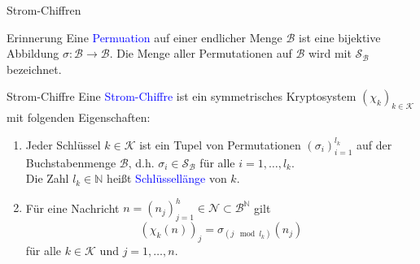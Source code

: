 \documentclass{beamer}
\newcommand{\mc}{\mathcal}
\newcommand{\N}{\mathbb{N}}
\newcommand{\Sy}{\mathcal{S}}
\newcommand{\tb}[1]{{\textcolor{blue}{#1}}}
\theoremstyle{plain}
\begin{document}
\begin{frame}{Strom-Chiffren}{~}
 \begin{block}{Erinnerung}
  Eine \tb{Permuation} auf einer endlicher Menge $\mc B$ ist eine bijektive Abbildung $\sigma: \mc B \rightarrow \mc B$. Die Menge aller Permutationen auf $\mc B$ wird mit $\Sy_{\mc B}$ bezeichnet.
 \end{block}
\pause
 \begin{block}{Strom-Chiffre}
 Eine \tb{Strom-Chiffre} ist ein symmetrisches Kryptosystem $(\chi_k)_{k \in \mc K}$ mit folgenden Eigenschaften:
 \begin{enumerate}
  \item Jeder Schlüssel $k \in \mc K$ ist ein Tupel von Permutationen $(\sigma_i)_{i=1}^{l_k}$ auf der Buchstabenmenge $\mc B$, d.h. $\sigma_i \in \Sy_{\mc B}$ für alle $i = 1, \dots, l_k$. \\ \pause
  Die Zahl $l_k \in \N$ heißt \tb{Schlüssellänge} von $k$. \\
    \pause
  \item Für eine Nachricht $n = (n_j)_{j=1}^h \in \mc N \subset \mc B^{\N}$ gilt 
   $$(\chi_k(n))_j = \sigma_{(j \mod l_k)}(n_j)$$
   für alle $k \in \mc K$ und $j = 1, \dots, n$.
 \end{enumerate}
 \end{block}
\end{frame}
\end{document}
